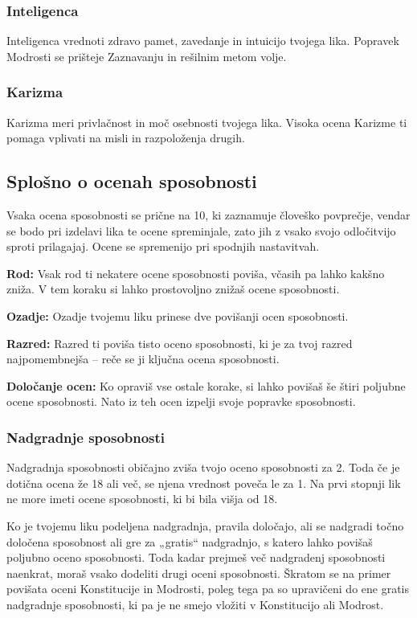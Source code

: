 \subsubsection{Inteligenca}
Inteligenca vrednoti zdravo pamet, zavedanje in intuicijo tvojega lika. Popravek Modrosti se prišteje Zaznavanju in rešilnim metom volje.

\subsubsection{Karizma}
Karizma meri privlačnost in moč osebnosti tvojega lika. Visoka ocena Karizme ti pomaga vplivati na misli in razpoloženja drugih.

\subsection{Splošno o ocenah sposobnosti}
Vsaka ocena sposobnosti se prične na 10, ki zaznamuje človeško povprečje, vendar se bodo pri izdelavi lika te ocene spreminjale, zato jih z vsako svojo odločitvijo sproti prilagajaj. Ocene se spremenijo pri spodnjih nastavitvah.

\textbf{Rod:} Vsak rod ti nekatere ocene sposobnosti poviša, včasih pa lahko kakšno zniža. V tem koraku si lahko prostovoljno znižaš ocene sposobnosti.

\textbf{Ozadje:} Ozadje tvojemu liku prinese dve povišanji ocen sposobnosti.

\textbf{Razred:} Razred ti poviša tisto oceno sposobnosti, ki je za tvoj razred najpomembnejša -- reče se ji ključna ocena sposobnosti.

\textbf{Določanje ocen:} Ko opraviš vse ostale korake, si lahko povišaš še štiri poljubne ocene sposobnosti. Nato iz teh ocen izpelji svoje popravke sposobnosti.

\subsubsection{Nadgradnje sposobnosti}
Nadgradnja sposobnosti običajno zviša tvojo oceno sposobnosti za 2. Toda če je dotična ocena že 18 ali več, se njena vrednost poveča le za 1. Na prvi stopnji lik ne more imeti ocene sposobnosti, ki bi bila višja od 18.

Ko je tvojemu liku podeljena nadgradnja, pravila določajo, ali se nadgradi točno določena sposobnost ali gre za „gratis“ nadgradnjo, s katero lahko povišaš poljubno oceno sposobnosti. Toda kadar prejmeš več nadgradenj sposobnosti naenkrat, moraš vsako dodeliti drugi oceni sposobnosti. Škratom se na primer povišata oceni Konstitucije in Modrosti, poleg tega pa so upravičeni do ene gratis nadgradnje sposobnosti, ki pa je ne smejo vložiti v Konstitucijo ali Modrost.

